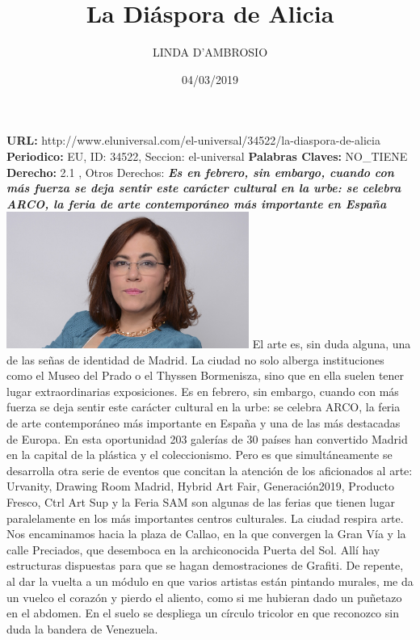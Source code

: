 \documentclass{article}%
\title{\textbf{La Diáspora de Alicia}}%
\author{LINDA D'AMBROSIO}%
\date{04/03/2019}%
\begin{document}
%
\normalsize%
\maketitle%
\textbf{URL: }%
http://www.eluniversal.com/el{-}universal/34522/la{-}diaspora{-}de{-}alicia\newline%
%
\textbf{Periodico: }%
EU, %
ID: %
34522, %
Seccion: %
el{-}universal\newline%
%
\textbf{Palabras Claves: }%
NO\_TIENE\newline%
%
\textbf{Derecho: }%
2.1%
, Otros Derechos: %
\newline%
%
\textbf{\textit{Es en febrero, sin embargo, cuando con más fuerza se deja sentir este carácter cultural en la urbe: se celebra ARCO, la feria de arte contemporáneo más importante en España}}%
\newline%
\newline%
%
\includegraphics[width=300px]{EU_34522.jpg}%
\newline%
%
El arte es, sin duda alguna, una de las señas de identidad de Madrid. La ciudad no solo alberga instituciones como el Museo del Prado o el Thyssen Bormenisza, sino que en ella suelen tener lugar extraordinarias exposiciones.%
\newline%
%
Es en febrero, sin embargo, cuando con más fuerza se deja sentir este carácter cultural en la urbe: se celebra ARCO, la feria de arte contemporáneo más importante en España y una de las más destacadas de Europa.%
\newline%
%
En esta oportunidad 203 galerías de 30 países han convertido Madrid en la capital de la plástica y el coleccionismo. Pero es que simultáneamente se desarrolla otra serie de eventos que concitan la atención de los aficionados al arte: Urvanity, Drawing Room Madrid, Hybrid Art Fair, Generación2019, Producto Fresco, Ctrl Art Sup y la Feria SAM son algunas de las ferias que tienen lugar paralelamente en los más importantes centros culturales.%
\newline%
%
La ciudad respira arte. Nos encaminamos hacia la plaza de Callao, en la que convergen la Gran Vía y la calle Preciados, que desemboca en la archiconocida Puerta del Sol. Allí hay estructuras dispuestas para que se hagan demostraciones de Grafiti. De repente, al dar la vuelta a un módulo en que varios artistas están pintando murales, me da un vuelco el corazón y pierdo el aliento, como si me hubieran dado un puñetazo en el abdomen. En el suelo se despliega un círculo tricolor en que reconozco sin duda la bandera de Venezuela.%
\end{document}
